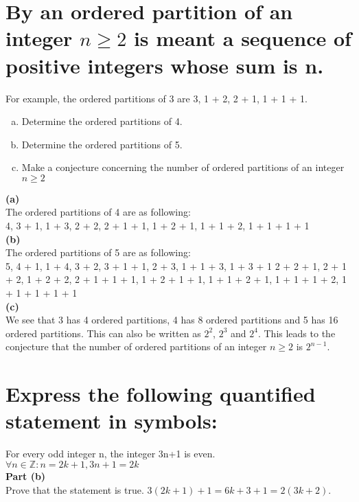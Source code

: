 \section{By an ordered partition of an integer $n\geq 2$ is meant a sequence of positive integers whose sum is n.}
For example, the ordered partitions of 3 are 3, 1 + 2, 2 + 1, 1 + 1 + 1.
\begin{enumerate}[(a)]
\item Determine the ordered partitions of 4.
\item Determine the ordered partitions of 5.
\item Make a conjecture concerning the number of ordered partitions of an integer $n\geq 2$
\end{enumerate}
\textbf{\Large(a)}\\
The ordered partitions of 4 are as following: \\
4,
 3 + 1, 1 + 3,
  2 + 2, 2 + 1 + 1, 1 + 2 + 1, 1 + 1 + 2,
   1 + 1 + 1 + 1\\
\textbf{\Large(b)}\\
The ordered partitions of 5 are as following: \\
5,
 4 + 1, 1 + 4,
  3 + 2, 3 + 1 + 1, 2 + 3, 1 + 1 + 3, 1 + 3 + 1
   2 + 2 + 1, 2 + 1 + 2, 1 + 2 + 2, 2 + 1 + 1 + 1, 1 + 2 + 1 + 1, 1 + 1 + 2 + 1, 1 + 1 + 1 + 2,
    1 + 1 + 1 + 1 + 1\\
\textbf{\Large(c)}\\
We see that 3 has 4 ordered partitions, 4 has 8 ordered partitions and 5 has 16 ordered partitions. This can also be written as $2^2$, $2^3$ and $2^4$. This leads to the conjecture that the number of ordered partitions of an integer $n\geq 2$ is $2^{n-1}$.{\Huge\Bat}


\section{Express the following quantified statement in symbols:}
For every odd integer n, the integer 3n+1 is even.\\
$\forall n\in \mathbb{Z} : n = 2k+1, 3n+1 = 2k$\\
\textbf{Part (b)} \\
Prove that the statement is true.
$3(2k+1)+1 = 6k +3 +1 = 2(3k+2)$.{\Huge\Bat}


